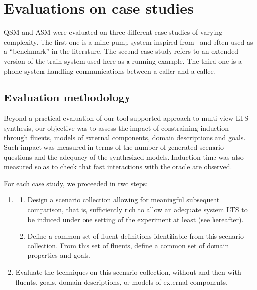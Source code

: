 \section{Evaluations on case studies\label{section:evaluation-experiments-on-case-studies}}

QSM and ASM were evaluated on three different case studies of varying complexity. The first one is a mine pump system inspired from~\cite{Joseph:1996} and often used as a ``benchmark'' in the literature. The second case study refers to an extended version of the train system used here as a running example. The third one is a phone system handling communications between a caller and a callee.

\subsection{Evaluation methodology}

Beyond a practical evaluation of our tool-supported approach to multi-view LTS synthesis, our objective was to assess the impact of constraining induction through fluents, models of external components, domain descriptions and goals. Such impact was measured in terms of the number of generated scenario questions and the adequacy of the synthesized models. Induction time was also measured so as to check that fast interactions with the oracle are observed.

For each case study, we proceeded in two steps:
\begin{enumerate}
\item\label{stepA}
\begin{enumerate}
\item\label{CondA} Design a scenario collection allowing for meaningful subsequent comparison, that is, sufficiently rich to allow an adequate system LTS to be induced under one setting of the experiment at least (see hereafter).
\item\label{CondB} Define a common set of fluent definitions identifiable from this scenario collection. From this set of fluents, define a common set of domain properties and goals.
\end{enumerate}
\item\label{stepB} Evaluate the techniques on this scenario collection, without and then with fluents, goals, domain descriptions, or models of external components.
\end{enumerate}

